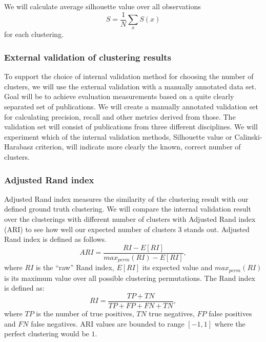 We will calculate average silhouette value over all observations
\begin{equation}
  S = \frac{1}{N} \sum_x S(x) 
\end{equation}
for each clustering.

\subsubsection{External validation of clustering results}
\label{sec:ext_val}
To support the choice of internal validation method for choosing
the number of clusters, we will use the external validation 
with a manually annotated data set. 
Goal will be to achieve evaluation measurements based on a quite 
clearly separated set of publications. 
We will create a manually annotated validation set for calculating
precision, recall and other metrics derived from those.
The validation set will consist of publications from three different
disciplines. We will experiment which of the internal validation
methods, Silhouette value or Calinski-Harabasz criterion, will
indicate more clearly the known, correct number of clusters.

\subsubsection{Adjusted Rand index}
Adjusted Rand index measures the similarity of the clustering result
with our defined ground truth clustering. We will compare the 
internal validation result over the clusterings with different number 
of clusters with Adjusted Rand index (ARI) 
\cite{hubert_comparing_1985} to see how well our expected number 
of clusters $3$ stands out. Adjusted Rand index is defined as 
follows.
\begin{equation}
 ARI = \frac{RI - E[RI]}{max_{perm}(RI) - E[RI]},
\end{equation}
where $RI$ is the ``raw'' Rand index, $E[RI]$ its expected value 
and $max_{perm}(RI)$ is its maximum value over all possible 
clustering permutations. The Rand index is defined as:
\begin{equation}
  RI = \frac{TP + TN}{TP + FP + FN + TN},
\end{equation}
where $TP$ is the number of true positives, $TN$ true negatives, 
$FP$ false positives and $FN$ false negatives. ARI values are 
bounded to range $[-1, 1]$ where the perfect clustering would 
be $1$.

